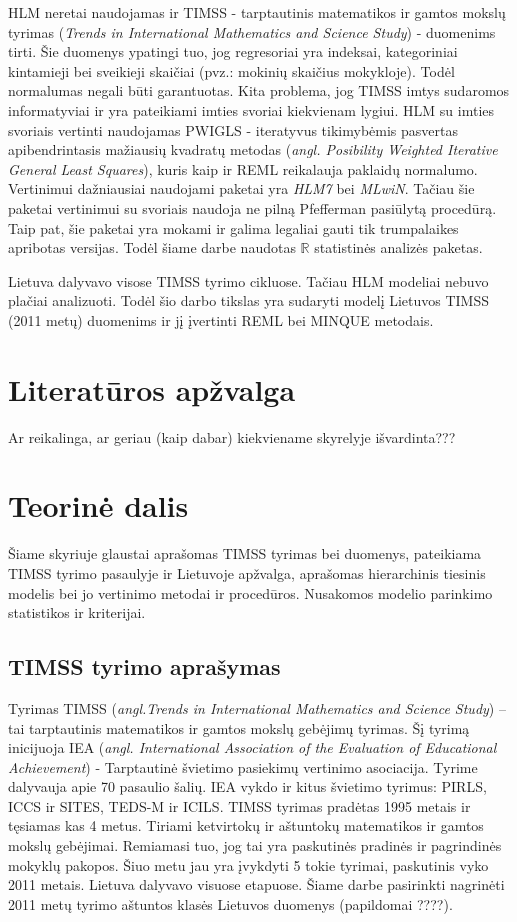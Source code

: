 \documentclass[12pt,a4paper]{article}
\newcommand{\R}{{\mathbb R}}
\begin{document}
\indent HLM neretai naudojamas ir TIMSS - tarptautinis matematikos ir gamtos mokslų tyrimas (\textit{Trends in International Mathematics and Science Study}) - duomenims tirti. Šie duomenys ypatingi tuo, jog regresoriai yra indeksai, kategoriniai kintamieji bei sveikieji skaičiai (pvz.: mokinių skaičius mokykloje). Todėl normalumas negali būti garantuotas. Kita problema, jog TIMSS imtys sudaromos informatyviai ir yra pateikiami imties svoriai kiekvienam lygiui. HLM su imties svoriais vertinti naudojamas PWIGLS - iteratyvus tikimybėmis pasvertas apibendrintasis mažiausių kvadratų metodas (\textit{angl. Posibility Weighted Iterative General Least Squares}), kuris kaip ir REML reikalauja paklaidų normalumo. Vertinimui dažniausiai naudojami paketai yra \textit{HLM7} bei \textit{MLwiN}. Tačiau šie paketai vertinimui su svoriais naudoja ne pilną Pfefferman pasiūlytą procedūrą. Taip pat, šie paketai yra mokami ir galima legaliai gauti tik trumpalaikes apribotas versijas. Todėl šiame darbe naudotas $\R$ statistinės analizės paketas.

\indent Lietuva dalyvavo visose TIMSS tyrimo cikluose. Tačiau HLM modeliai nebuvo plačiai analizuoti. Todėl šio darbo tikslas yra sudaryti modelį Lietuvos TIMSS (2011 metų) duomenims ir jį įvertinti REML bei MINQUE metodais.

\newpage
\section{Literatūros apžvalga}
Ar reikalinga, ar geriau (kaip dabar) kiekviename skyrelyje išvardinta???

\newpage
\section{Teorinė dalis}
Šiame skyriuje glaustai aprašomas TIMSS tyrimas bei duomenys, pateikiama TIMSS tyrimo pasaulyje ir Lietuvoje apžvalga, aprašomas hierarchinis tiesinis modelis bei jo vertinimo metodai ir procedūros. Nusakomos modelio parinkimo statistikos ir kriterijai.

\subsection{TIMSS tyrimo aprašymas}

\indent Tyrimas TIMSS (\textit{angl.Trends in International Mathematics and Science Study}) – tai tarptautinis matematikos ir gamtos mokslų gebėjimų tyrimas. Šį tyrimą inicijuoja IEA (\textit{angl. International Association of the Evaluation of Educational Achievement}) - Tarptautinė švietimo pasiekimų vertinimo asociacija. Tyrime dalyvauja apie 70 pasaulio šalių. IEA vykdo ir kitus švietimo tyrimus: PIRLS, ICCS ir SITES, TEDS-M ir ICILS. TIMSS tyrimas pradėtas 1995 metais ir tęsiamas kas 4 metus. Tiriami ketvirtokų ir aštuntokų matematikos ir gamtos mokslų gebėjimai. Remiamasi tuo, jog tai yra paskutinės pradinės ir pagrindinės mokyklų pakopos. Šiuo metu jau yra įvykdyti 5 tokie tyrimai, paskutinis vyko 2011 metais. Lietuva dalyvavo visuose etapuose. Šiame darbe pasirinkti nagrinėti 2011 metų tyrimo aštuntos klasės Lietuvos duomenys (papildomai ????). \cite{timss2011lt}
\end{document}
